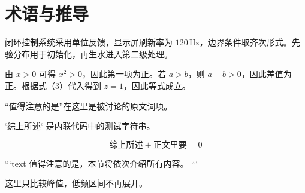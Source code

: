 \section{术语与推导}

闭环控制系统采用单位反馈，显示屏刷新率为 $120\,\mathrm{Hz}$，边界条件取齐次形式。先验分布用于初始化，再生水进入第二级处理。

由 $x>0$ 可得 $x^2>0$，因此第一项为正。若 $a>b$，则 $a-b>0$，因此差值为正。根据式（3）代入得到 $z=1$，因此等式成立。

“值得注意的是”在这里是被讨论的原文词项。

`综上所述` 是内联代码中的测试字符串。


\[
  \text{综上所述} + \text{正文里要} = 0
\]

```text
值得注意的是，本节将依次介绍所有内容。
```

这里只比较峰值，低频区间不再展开。
